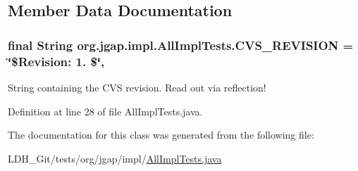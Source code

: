 \subsection{Member Data Documentation}
\hypertarget{classorg_1_1jgap_1_1impl_1_1_all_impl_tests_a2d88d651245f7d1be32a673540484b81}{
\subsubsection[{C\-V\-S\-\_\-\-R\-E\-V\-I\-S\-I\-O\-N}]{\setlength{\rightskip}{0pt plus 5cm}final String org.\-jgap.\-impl.\-All\-Impl\-Tests.\-C\-V\-S\-\_\-\-R\-E\-V\-I\-S\-I\-O\-N = \char`\"{}\$Revision\-: 1. \$\char`\"{}\hspace{0.3cm}{\ttfamily [static]}, {\ttfamily [private]}}}\label{classorg_1_1jgap_1_1impl_1_1_all_impl_tests_a2d88d651245f7d1be32a673540484b81}
String containing the C\-V\-S revision. Read out via reflection! 

Definition at line 28 of file All\-Impl\-Tests.\-java.



The documentation for this class was generated from the following file\-:\begin{DoxyCompactItemize}
\item 
L\-D\-H\-\_\-\-Git/tests/org/jgap/impl/\hyperlink{_all_impl_tests_8java}{All\-Impl\-Tests.\-java}\end{DoxyCompactItemize}
